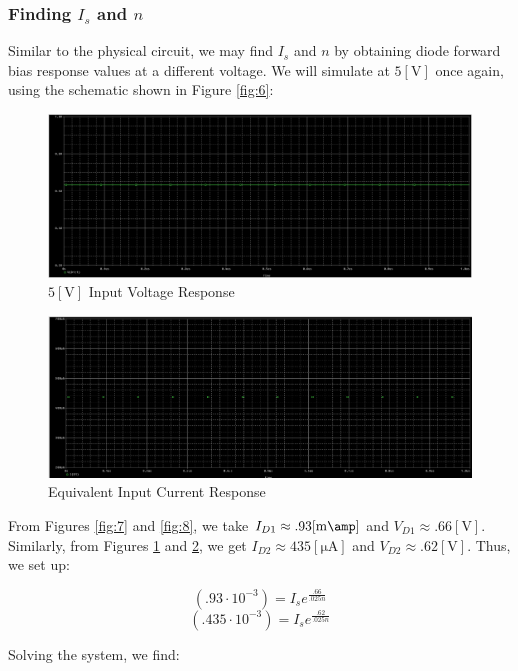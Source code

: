\documentclass[
	letterpaper, %
	10pt, %
]{CSUniSchoolLabReport}
\begin{document}
  \subsubsection{Finding $I_s$ and $n$}

  Similar to the physical circuit, we may find $I_s$ and $n$ by obtaining diode forward bias response values at a different voltage. We will simulate at $5[\si{\volt}]$ once again, using the schematic shown in Figure \ref{fig:6}:

  \begin{figure}[H]
    \centering
    \includegraphics[width=.9\textwidth]{Figures/L2F10}
    \caption{$5[\si{\volt}]$ Input Voltage Response}
    \label{fig:11}
  \end{figure}

  \begin{figure}[H]
    \centering
    \includegraphics[width=.9\textwidth]{Figures/L2F11}
    \caption{Equivalent Input Current Response}
    \label{fig:12}
  \end{figure}

  From Figures \ref{fig:7} and \ref{fig:8}, we take $I_{D1}\approx.93[\si{\milli\amp}]$ and $V_{D1}\approx .66[\si{\volt}]$. Similarly, from Figures \ref{fig:11} and \ref{fig:12}, we get $I_{D2}\approx 435[\si{\micro\ampere}]$ and $V_{D2}\approx .62[\si{\volt}]$. Thus, we set up:

  $$\left( .93\cdot10^{-3} \right)=I_se^{\frac{.66}{.025n}}$$
  $$\left( .435\cdot10^{-3} \right)=I_se^{\frac{.62}{.025n}}$$

  Solving the system, we find:
\end{document}
